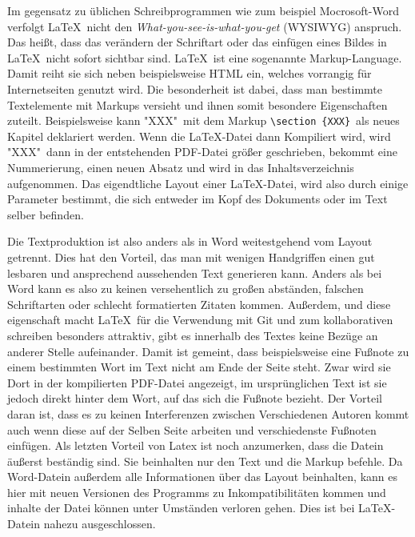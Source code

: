 \documentclass[12pt,a4paper]{scrartcl}
\begin{document}
Im gegensatz zu üblichen Schreibprogrammen wie zum beispiel Mocrosoft-Word verfolgt \LaTeX \ nicht den \emph{What-you-see-is-what-you-get} (WYSIWYG) anspruch. Das heißt, dass das verändern der Schriftart oder das einfügen eines Bildes in \LaTeX \ nicht sofort sichtbar sind. \LaTeX \ ist eine sogenannte Markup-Language. Damit reiht sie sich neben beispielsweise HTML ein, welches vorrangig für Internetseiten genutzt wird. Die besonderheit ist dabei, dass man bestimmte Textelemente mit Markups versieht und ihnen somit besondere Eigenschaften zuteilt. Beispielsweise kann "XXX"\ mit dem Markup \verb+\section+~\verb+{XXX}+\ als neues Kapitel deklariert werden. Wenn die \LaTeX -Datei dann Kompiliert wird, wird "XXX"\ dann in der entstehenden PDF-Datei größer geschrieben, bekommt eine Nummerierung, einen neuen Absatz und wird in das Inhaltsverzeichnis aufgenommen. Das eigendtliche Layout einer \LaTeX -Datei, wird also durch einige Parameter bestimmt, die sich entweder im Kopf des Dokuments oder im Text selber befinden. 

Die Textproduktion ist also anders als in Word weitestgehend vom Layout getrennt. Dies hat den Vorteil, das man mit wenigen Handgriffen einen gut lesbaren und ansprechend aussehenden Text generieren kann. Anders als bei Word kann es also zu keinen versehentlich zu großen abständen, falschen Schriftarten oder schlecht formatierten Zitaten kommen. Außerdem, und diese eigenschaft macht \LaTeX \ für die Verwendung mit Git und zum kollaborativen schreiben besonders attraktiv, gibt es innerhalb des Textes keine Bezüge an anderer Stelle aufeinander. Damit ist gemeint, dass beispielsweise eine Fußnote zu einem bestimmten Wort im Text nicht am Ende der Seite steht. Zwar wird sie Dort in der kompilierten PDF-Datei angezeigt, im ursprünglichen Text ist sie jedoch direkt hinter dem Wort, auf das sich die Fußnote bezieht. Der Vorteil daran ist, dass es zu keinen Interferenzen zwischen Verschiedenen Autoren kommt auch wenn diese auf der Selben Seite arbeiten und verschiedenste Fußnoten einfügen. Als letzten Vorteil von Latex ist noch anzumerken, dass die Datein äußerst beständig sind. Sie beinhalten nur den Text und die Markup befehle. Da Word-Datein außerdem alle Informationen über das Layout beinhalten, kann es hier mit neuen Versionen des Programms zu Inkompatibilitäten kommen und inhalte der Datei können unter Umständen verloren gehen. Dies ist bei \LaTeX -Datein nahezu ausgeschlossen.
\end{document}
